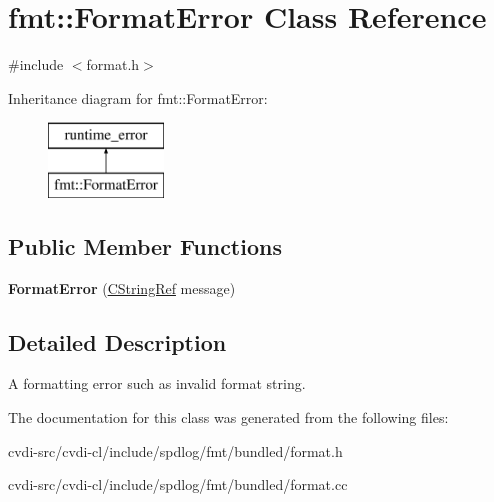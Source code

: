 \hypertarget{classfmt_1_1FormatError}{}\section{fmt\+:\+:Format\+Error Class Reference}
\label{classfmt_1_1FormatError}


{\ttfamily \#include $<$format.\+h$>$}

Inheritance diagram for fmt\+:\+:Format\+Error\+:\begin{figure}[H]
\begin{center}
\leavevmode
\includegraphics[height=2.000000cm]{classfmt_1_1FormatError}
\end{center}
\end{figure}
\subsection*{Public Member Functions}
\begin{DoxyCompactItemize}
\item 
{\bfseries Format\+Error} (\hyperlink{classfmt_1_1BasicCStringRef}{C\+String\+Ref} message)\hypertarget{classfmt_1_1FormatError_adceda84540093a114256a7159b30bf5e}{}\label{classfmt_1_1FormatError_adceda84540093a114256a7159b30bf5e}

\end{DoxyCompactItemize}


\subsection{Detailed Description}
A formatting error such as invalid format string. 

The documentation for this class was generated from the following files\+:\begin{DoxyCompactItemize}
\item 
cvdi-\/src/cvdi-\/cl/include/spdlog/fmt/bundled/format.\+h\item 
cvdi-\/src/cvdi-\/cl/include/spdlog/fmt/bundled/format.\+cc\end{DoxyCompactItemize}
